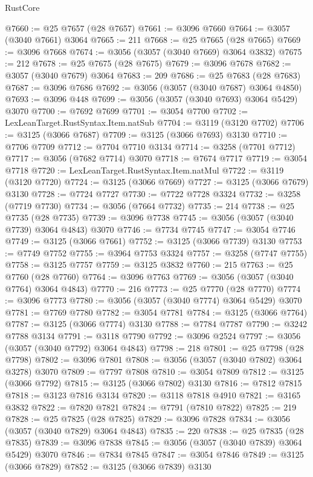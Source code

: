 \begin{lexlean}{RustCore}
\begin{coremodule}
@7660 := @25 @7657 (@28 @7657)
@7661 := @3096 @7660
@7664 := @3057 (@3040 @7661) @3064
@7665 := 211
@7668 := @25 @7665 (@28 @7665)
@7669 := @3096 @7668
@7674 := @3056 (@3057 (@3040 @7669) @3064 @3832)
@7675 := 212
@7678 := @25 @7675 (@28 @7675)
@7679 := @3096 @7678
@7682 := @3057 (@3040 @7679) @3064
@7683 := 209
@7686 := @25 @7683 (@28 @7683)
@7687 := @3096 @7686
@7692 := @3056 (@3057 (@3040 @7687) @3064 @4850)
@7693 := @3096 @448
@7699 := @3056 (@3057 (@3040 @7693) @3064 @5429) @3070
@7700 := @7692 @7699
@7701 := @3054 @7700
@7702 := LexLeanTarget.RustSyntax.Item.natSub
@7704 := @3119 (@3120 @7702)
@7706 := @3125 (@3066 @7687)
@7709 := @3125 (@3066 @7693) @3130
@7710 := @7706 @7709
@7712 := @7704 @7710 @3134
@7714 := @3258 (@7701 @7712)
@7717 := @3056 (@7682 @7714) @3070
@7718 := @7674 @7717
@7719 := @3054 @7718
@7720 := LexLeanTarget.RustSyntax.Item.natMul
@7722 := @3119 (@3120 @7720)
@7724 := @3125 (@3066 @7669)
@7727 := @3125 (@3066 @7679) @3130
@7728 := @7724 @7727
@7730 := @7722 @7728 @3324
@7732 := @3258 (@7719 @7730)
@7734 := @3056 (@7664 @7732)
@7735 := 214
@7738 := @25 @7735 (@28 @7735)
@7739 := @3096 @7738
@7745 := @3056 (@3057 (@3040 @7739) @3064 @4843) @3070
@7746 := @7734 @7745
@7747 := @3054 @7746
@7749 := @3125 (@3066 @7661)
@7752 := @3125 (@3066 @7739) @3130
@7753 := @7749 @7752
@7755 := @3964 @7753 @3324
@7757 := @3258 (@7747 @7755)
@7758 := @3125 @7757
@7759 := @3125 @3832
@7760 := 215
@7763 := @25 @7760 (@28 @7760)
@7764 := @3096 @7763
@7769 := @3056 (@3057 (@3040 @7764) @3064 @4843)
@7770 := 216
@7773 := @25 @7770 (@28 @7770)
@7774 := @3096 @7773
@7780 := @3056 (@3057 (@3040 @7774) @3064 @5429) @3070
@7781 := @7769 @7780
@7782 := @3054 @7781
@7784 := @3125 (@3066 @7764)
@7787 := @3125 (@3066 @7774) @3130
@7788 := @7784 @7787
@7790 := @3242 @7788 @3134
@7791 := @3118 @7790
@7792 := @3096 @2524
@7797 := @3056 (@3057 (@3040 @7792) @3064 @4843)
@7798 := 218
@7801 := @25 @7798 (@28 @7798)
@7802 := @3096 @7801
@7808 := @3056 (@3057 (@3040 @7802) @3064 @3278) @3070
@7809 := @7797 @7808
@7810 := @3054 @7809
@7812 := @3125 (@3066 @7792)
@7815 := @3125 (@3066 @7802) @3130
@7816 := @7812 @7815
@7818 := @3123 @7816 @3134
@7820 := @3118 @7818 @4910
@7821 := @3165 @3832
@7822 := @7820 @7821
@7824 := @7791 (@7810 @7822)
@7825 := 219
@7828 := @25 @7825 (@28 @7825)
@7829 := @3096 @7828
@7834 := @3056 (@3057 (@3040 @7829) @3064 @4843)
@7835 := 220
@7838 := @25 @7835 (@28 @7835)
@7839 := @3096 @7838
@7845 := @3056 (@3057 (@3040 @7839) @3064 @5429) @3070
@7846 := @7834 @7845
@7847 := @3054 @7846
@7849 := @3125 (@3066 @7829)
@7852 := @3125 (@3066 @7839) @3130

\end{coremodule}
\end{lexlean}
